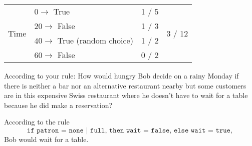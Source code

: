 \documentclass[fontsize=12pt, usenames, dvipsnames, headinclude, headsepline, footinclude, footsepline]{scrartcl}
\begin{document}
\begin{table}[h]
\begin{tabular}{@{}rlcc@{}}
\multirow{4}{*}{Time}                       & $0 \to$ True                                        & 1 / 5                      & \multirow{4}{*}{3 / 12}                     \\
                                            & $20 \to$ False                                      & 1 / 3                      &                                             \\
                                            & $40 \to$ True (random choice)                       & 1 / 2                      &                                             \\
                                            & $60 \to$ False                                      & 0 / 2                      &                                             \\ \bottomrule
\end{tabular}
\end{table}




\begin{exo}
According to your rule: How would hungry Bob decide on a rainy Monday if there is neither a
bar nor an alternative restaurant nearby but some customers are in this expensive Swiss
restaurant where he doesn’t have to wait for a table because he did make a reservation?
\end{exo}

  \begin{sol}
    According to the rule
    \[ \mathtt{\text{if patron = none | full, then wait = false, else wait = true}},\]
    Bob would wait for a table.
  \end{sol}





	
\end{document}
